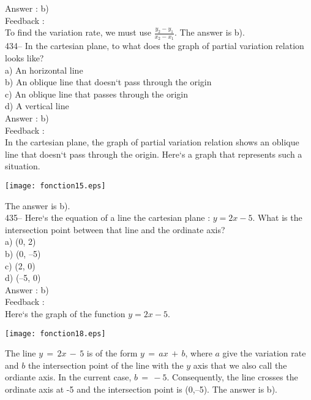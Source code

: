 ﻿\documentclass[letterpaper, 12pt]{article}
\begin{document}
Answer :  b)\\

Feedback : \\
To find the variation rate, we must use
$\frac{y_2-y_1}{x_2-x_1}$.  The answer is b).\\

434--  In the cartesian plane, to what does the graph of partial variation relation looks like?\\
a) An horizontal line\\
b) An oblique line that doesn`t pass through the origin\\
c) An oblique line that passes through the origin\\
d) A vertical line\\

Answer :  b)\\

Feedback : \\
In the cartesian plane, the graph of partial variation relation shows an oblique line that doesn`t pass through the origin. Here`s a graph that represents such a situation.\\
    \begin{center}
    \texttt{[image: fonction15.eps]}
    \end{center}

The answer is b).\\

435-- Here`s the equation of a line the cartesian plane : $y=2x-5$.
What is the intersection point between that line and the ordinate axis?\\
a) (0, 2)\\
b) (0, --5)\\
c) (2, 0)\\
d) (--5, 0)\\

Answer :  b)\\

Feedback : \\
Here`s the graph of the function $y=2x-5$.\\
    \begin{center}
    \texttt{[image: fonction18.eps]}
    \end{center}

The line $y\,=\,2x\,-\,5$ is of the form $y\,=\,ax\,+\,b$, where
$a$ give the variation rate and $b$ the intersection point of the line with the $y$ axis that we also call the ordiante axis.
In the current case, $b\,=\,-5$. Consequently, the line crosses the ordinate axis at -5 and the intersection point is (0,--5).
The answer is b).\\
\end{document}
